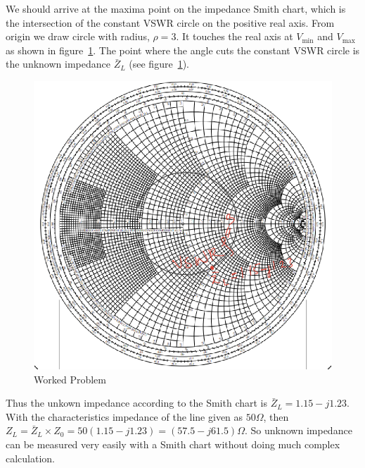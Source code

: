 \begin{exmp}
We should arrive at the maxima point on the impedance Smith chart, which is the intersection of the constant VSWR circle on the positive real axis. From origin we draw circle with radius, $\rho = 3$. It touches the real axis at $V_\min$ and $V_\max$ as shown in figure~\ref{fig:slottedlinesoln}. The point where the angle cuts the constant VSWR circle is the unknown impedance $\bar{Z}_L$ (see figure~\ref{fig:slottedlinesoln}).
\begin{figure}
\centering
\includegraphics[width=1\linewidth]{./graphics/slotted_line_soln_temp}
\caption{Worked Problem}
\label{fig:slottedlinesoln}
\end{figure}

Thus the unkown impedance according to the Smith chart is $\bar{Z}_L=1.15-j1.23$. With the characteristics impedance of the line given as $50\varOmega$, then $Z_{L}=\bar{Z}_L\times Z_0 =50(1.15-j1.23)= (57.5-j61.5) \varOmega$. So unknown impedance can be measured very easily with a Smith chart without doing much complex calculation.
\end{exmp}

